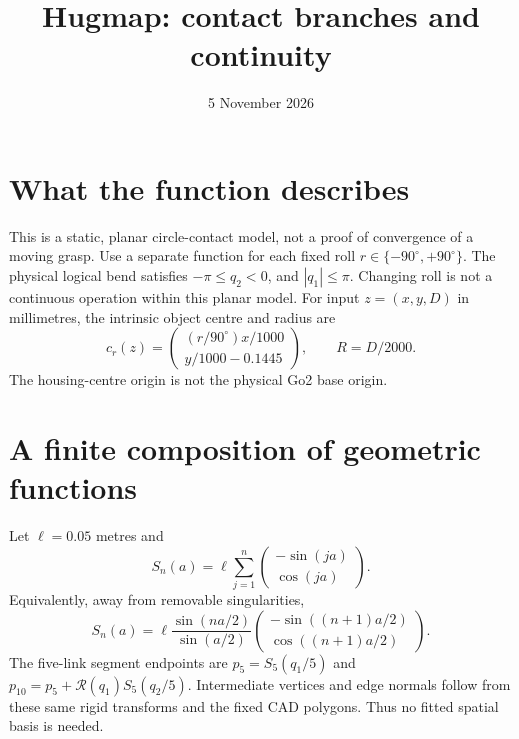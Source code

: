\documentclass[11pt]{article}
\title{Hugmap: contact branches and continuity}
\date{5 November 2026}
\begin{document}
\maketitle
\section{What the function describes}
This is a static, planar circle-contact model, not a proof of convergence of a moving grasp.
Use a separate function for each fixed roll $r\in\{-90^\circ,+90^\circ\}$.
The physical logical bend satisfies $-\pi\le q_2<0$, and $|q_1|\le\pi$.
Changing roll is not a continuous operation within this planar model.
For input $z=(x,y,D)$ in millimetres, the intrinsic object centre and radius are
\[
 c_r(z)=\begin{pmatrix}(r/90^\circ)x/1000\\y/1000-0.1445\end{pmatrix},
 \qquad R=D/2000.
\]
The housing-centre origin is not the physical Go2 base origin.

\section{A finite composition of geometric functions}
Let $\ell=0.05$ metres and
\[
 S_n(a)=\ell\sum_{j=1}^{n}\begin{pmatrix}-\sin(ja)\\\cos(ja)\end{pmatrix}.
\]
Equivalently, away from removable singularities,
\[
 S_n(a)=\ell\frac{\sin(na/2)}{\sin(a/2)}
 \begin{pmatrix}-\sin((n+1)a/2)\\\cos((n+1)a/2)\end{pmatrix}.
\]
The five-link segment endpoints are $p_5=S_5(q_1/5)$ and
$p_{10}=p_5+\mathcal R(q_1)S_5(q_2/5)$.
Intermediate vertices and edge normals follow from these same rigid transforms
and the fixed CAD polygons. Thus no fitted spatial basis is needed.
\end{document}
